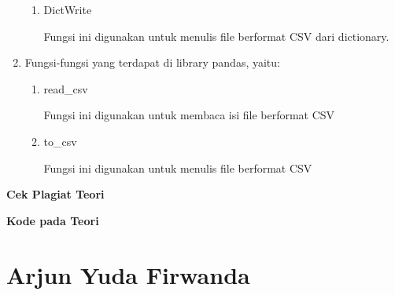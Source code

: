 \begin{enumerate}
\begin{enumerate}
		\item DictWrite
		
		Fungsi ini digunakan untuk menulis file berformat CSV dari dictionary.
		
		
		
	\end{enumerate}
	
	\item Fungsi-fungsi yang terdapat di library pandas, yaitu:
	\begin{enumerate}
		\item read\_csv
		
		Fungsi ini digunakan untuk membaca isi file berformat CSV
		
		
		
		\item to\_csv
		
		Fungsi ini digunakan untuk menulis file berformat CSV
		
		
		
	\end{enumerate}
\end{enumerate}

\textbf{Cek Plagiat Teori}


\textbf{Kode pada Teori}



\section{Arjun Yuda Firwanda}

